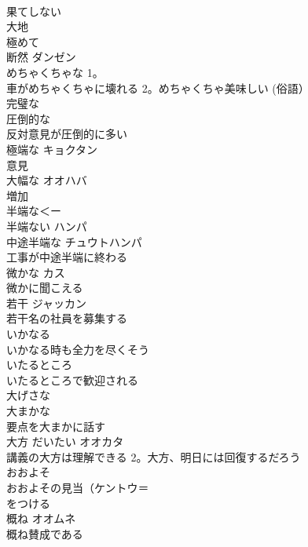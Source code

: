 \documentclass[8pt]{extreport}
\begin{document}
\begin{CJK}{UTF8}{min}
\\	果てしない	
\\	大地	
\\	極めて	
\\	断然	ダンゼン 
\\	めちゃくちゃな	1。
\\	車がめちゃくちゃに壊れる 2。めちゃくちゃ美味しい (俗語）
\\	完璧な	
\\	圧倒的な	
\\	反対意見が圧倒的に多い
\\	極端な	キョクタン 
\\	意見
\\	大幅な	オオハバ 
\\	増加
\\	半端な＜ー
\\	半端ない	ハンパ 
\\	中途半端な	チュウトハンパ 
\\	工事が中途半端に終わる
\\	微かな	カス 
\\	微かに聞こえる
\\	若干	ジャッカン 
\\	若干名の社員を募集する
\\	いかなる	
\\	いかなる時も全力を尽くそう
\\	いたるところ	
\\	いたるところで歓迎される
\\	大げさな	
\\	大まかな	
\\	要点を大まかに話す
\\	大方 だいたい	オオカタ 
\\	講義の大方は理解できる 2。大方、明日には回復するだろう
\\	おおよそ	
\\	おおよその見当（ケントウ＝
\\	をつける
\\	概ね	オオムネ 
\\	概ね賛成である
\end{CJK}
\end{document}
